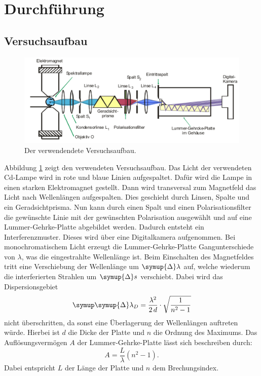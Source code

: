 \documentclass[
  bibliography=totoc,     %
  captions=tableheading,  %
  titlepage=firstiscover, %
]{scrartcl}
\begin{document}
\section{Durchführung}
\subsection{Versuchsaufbau}
\begin{figure}
  \centering
  \includegraphics[scale=0.39]{aufbau.png}
  \caption{Der verwendendete Versuchsaufbau. \cite{anleitung}}
  \label{fig:3}
\end{figure}
\noindent
Abbildung \ref{fig:3} zeigt den verwendeten Versuchsaufbau. Das Licht der
verwendeten Cd-Lampe wird in rote und blaue Linien aufgespaltet. Dafür wird die
Lampe in einen starken Elektromagnet gestellt. Dann
wird transversal zum Magnetfeld das Licht nach Wellenlängen aufgespalten. Dies
geschieht durch Linsen, Spalte und ein Geradsichtprisma. Nun kann durch einen
Spalt und einen Polarisationsfilter die gewünschte Linie mit der gewünschten
Polarisation ausgewählt und auf eine Lummer-Gehrke-Platte abgebildet werden.
Dadurch entsteht ein Interferenzmuster. Dieses wird über eine Digitalkamera
aufgenommen. Bei monochromatischem Licht erzeugt die Lummer-Gehrke-Platte
Gangunterschiede von $\lambda$, was die eingestrahlte Wellenlänge ist. Beim
Einschalten des Magnetfeldes tritt eine Verschiebung der Wellenlänge um
$\symup{\Delta} \lambda$ auf, welche wiederum die interferierten Strahlen
um $\symup{\Delta} s$ verschiebt. Dabei wird das Dispersionsgebiet
\begin{equation}
    \symup \symup{\Delta} \lambda_D = \frac{\lambda^2}{2\, d} \cdot \sqrt{\frac{1}{n^2 - 1}}
    \label{eqn:11}
\end{equation}
nicht überschritten, da sonst eine Überlagerung der Wellenlängen auftreten würde.
Hierbei ist $d$ die Dicke der Platte und $n$ die Ordnung des Maximums. Das
Auflösungsvermögen $A$ der Lummer-Gehrke-Platte lässt sich beschreiben durch:
\begin{equation}
  A = \frac{L}{\lambda} (n^2 - 1).
  \label{eqn:12}
\end{equation}
Dabei entspricht $L$ der Länge der Platte und $n$ dem Brechungsindex.
\clearpage
\end{document}
